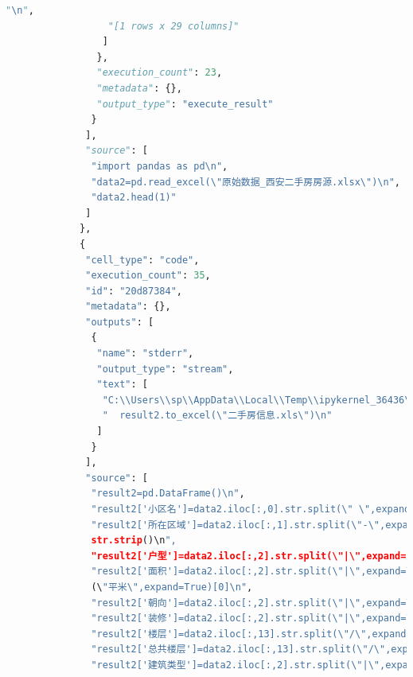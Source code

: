 \documentclass[withoutpreface,bwprint]{cumcmthesis} %
\begin{document}
\begin{appendices}
\begin{lstlisting}[language=Python]
                  "\n",
                  "[1 rows x 29 columns]"
                 ]
                },
                "execution_count": 23,
                "metadata": {},
                "output_type": "execute_result"
               }
              ],
              "source": [
               "import pandas as pd\n",
               "data2=pd.read_excel(\"原始数据_西安二手房房源.xlsx\")\n",
               "data2.head(1)"
              ]
             },
             {
              "cell_type": "code",
              "execution_count": 35,
              "id": "20d87384",
              "metadata": {},
              "outputs": [
               {
                "name": "stderr",
                "output_type": "stream",
                "text": [
                 "C:\\Users\\sp\\AppData\\Local\\Temp\\ipykernel_36436\\3555151398.py:27: FutureWarning: As the xlwt package is no longer maintained, the xlwt engine will be removed in a future version of pandas. This is the only engine in pandas that supports writing in the xls format. Install openpyxl and write to an xlsx file instead. You can set the option io.excel.xls.writer to 'xlwt' to silence this warning. While this option is deprecated and will also raise a warning, it can be globally set and the warning suppressed.\n",
                 "  result2.to_excel(\"二手房信息.xls\")\n"
                ]
               }
              ],
              "source": [
               "result2=pd.DataFrame()\n",
               "result2['小区名']=data2.iloc[:,0].str.split(\" \",expand=True)[0]\n",
               "result2['所在区域']=data2.iloc[:,1].str.split(\"-\",expand=True)[1].
               str.strip()\n",
               "result2['户型']=data2.iloc[:,2].str.split(\"|\",expand=True)[0]\n",
               "result2['面积']=data2.iloc[:,2].str.split(\"|\",expand=True)[1].str.split
               (\"平米\",expand=True)[0]\n",
               "result2['朝向']=data2.iloc[:,2].str.split(\"|\",expand=True)[2]\n",
               "result2['装修']=data2.iloc[:,2].str.split(\"|\",expand=True)[3]\n",
               "result2['楼层']=data2.iloc[:,13].str.split(\"/\",expand=True)[0]\n",
               "result2['总共楼层']=data2.iloc[:,13].str.split(\"/\",expand=True)[1]\n",
               "result2['建筑类型']=data2.iloc[:,2].str.split(\"|\",expand=True)[5]\n",

\end{lstlisting}
\end{appendices}
\end{document}
